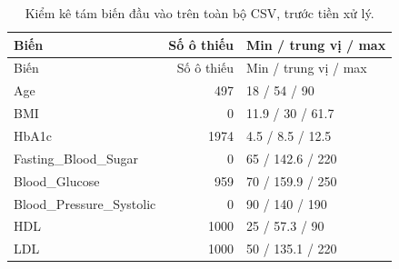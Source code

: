 \begin{longtable}{p{6cm}rp{5cm}}\caption{Kiểm kê tám biến đầu vào trên toàn bộ CSV, trước tiền xử lý.}\label{tab:data-fields}\\\toprule Biến & Số ô thiếu & Min / trung vị / max\\\midrule\endfirsthead\toprule Biến & Số ô thiếu & Min / trung vị / max\\\midrule\endhead
Age & 497 & 18 / 54 / 90\\
BMI & 0 & 11.9 / 30 / 61.7\\
HbA1c & 1974 & 4.5 / 8.5 / 12.5\\
Fasting\_Blood\_Sugar & 0 & 65 / 142.6 / 220\\
Blood\_Glucose & 959 & 70 / 159.9 / 250\\
Blood\_Pressure\_Systolic & 0 & 90 / 140 / 190\\
HDL & 1000 & 25 / 57.3 / 90\\
LDL & 1000 & 50 / 135.1 / 220\\\bottomrule\end{longtable}